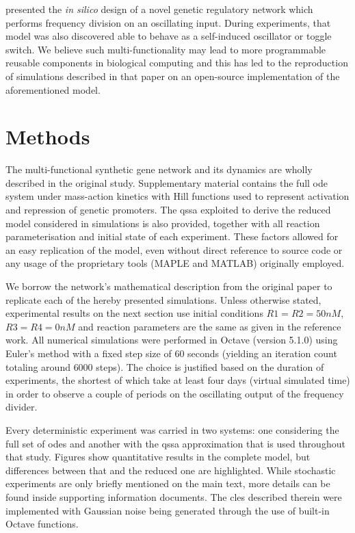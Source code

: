   \citet{multif} presented the \textit{in silico} design of a novel genetic regulatory network which performs frequency division on an oscillating input.
  During experiments, that model was also discovered able to behave as a self-induced oscillator or toggle switch.
  We believe such multi-functionality may lead to more programmable reusable components in biological computing and this has led to the reproduction of simulations described in that paper on an open-source implementation of the aforementioned model.


\section{Methods}

  The multi-functional synthetic gene network and its dynamics are wholly described in the original study.
  Supplementary material contains the full \ac{ode} system under mass-action kinetics with Hill functions used to represent activation and repression of genetic promoters.
  The \ac{qssa} exploited to derive the reduced model considered in simulations is also provided, together with all reaction parameterisation and initial state of each experiment.
  These factors allowed for an easy replication of the model, even without direct reference to source code or any usage of the proprietary tools (MAPLE and MATLAB) originally employed.

  We borrow the network's mathematical description from the original paper to replicate each of the hereby presented simulations.
  Unless otherwise stated, experimental results on the next section use initial conditions $R1 = R2 = 50nM$, $R3 = R4 = 0nM$ and reaction parameters are the same as given in the reference work.
  All numerical simulations were performed in Octave (version 5.1.0) using Euler's method with a fixed step size of $60$ seconds (yielding an iteration count totaling around $6000$ steps).
  The choice is justified based on the duration of experiments, the shortest of which take at least four days (virtual simulated time) in order to observe a couple of periods on the oscillating output of the frequency divider.

  Every deterministic experiment was carried in two systems: one considering the full set of \ac{ode}s and another with the \ac{qssa} approximation that is used throughout that study.
  Figures show quantitative results in the complete model, but differences between that and the reduced one are highlighted.
  While stochastic experiments are only briefly mentioned on the main text, more details can be found inside supporting information documents.
  The \ac{cles} described therein were implemented with Gaussian noise being generated through the use of built-in Octave functions.


